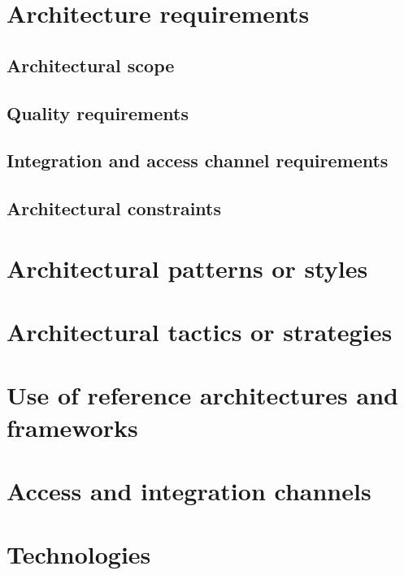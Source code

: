 \documentclass[pdftex,10pt,a4paper]{report}
\begin{document}


\newpage


\newpage
{}

\tableofcontents 

\newpage
{}

\begingroup
\renewcommand{\cleardoublepage}{}
\renewcommand{\clearpage}{}
\chapter{Architecture requirements}
	\section{Architectural scope}
		
	\section{Quality requirements}
		
	\section{Integration and access channel requirements}
		
	\section{Architectural constraints}
		
	
\begingroup
\renewcommand{\cleardoublepage}{}
\renewcommand{\clearpage}{}	
\chapter{Architectural patterns or styles}
	
\endgroup

\newpage
	
\begingroup
\renewcommand{\cleardoublepage}{}
\renewcommand{\clearpage}{}
\chapter{Architectural tactics or strategies}
	
\endgroup

\newpage
	
\begingroup
\renewcommand{\cleardoublepage}{}
\renewcommand{\clearpage}{}	
\chapter{Use of reference architectures and frameworks}
	
\endgroup

\newpage

\begingroup
\renewcommand{\cleardoublepage}{}
\renewcommand{\clearpage}{}
\chapter{Access and integration channels}
	
\endgroup

\newpage
	
\begingroup
\renewcommand{\cleardoublepage}{}
\renewcommand{\clearpage}{}
\chapter{Technologies}
	
\endgroup
	
\end{document}
